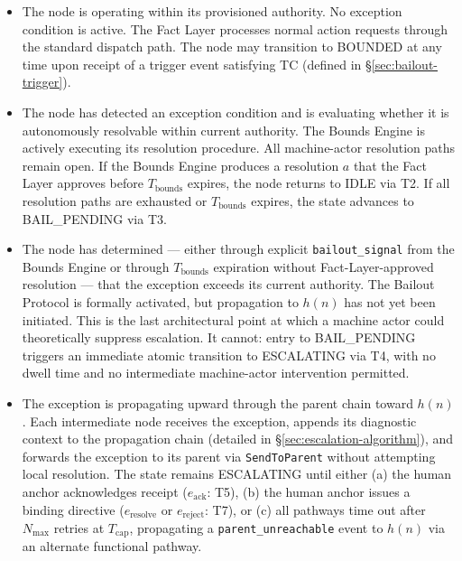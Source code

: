 \begin{itemize}\itemsep0em
\item[\textbf{IDLE.}] The node is operating within its provisioned authority. No exception condition is active. The Fact Layer processes normal action requests through the standard dispatch path. The node may transition to BOUNDED at any time upon receipt of a trigger event satisfying TC (defined in \S\ref{sec:bailout-trigger}).

\item[\textbf{BOUNDED.}] The node has detected an exception condition and is evaluating whether it is autonomously resolvable within current authority. The Bounds Engine is actively executing its resolution procedure. All machine-actor resolution paths remain open. If the Bounds Engine produces a resolution $a$ that the Fact Layer approves before $T_{\text{bounds}}$ expires, the node returns to IDLE via T2. If all resolution paths are exhausted or $T_{\text{bounds}}$ expires, the state advances to BAIL\_PENDING via T3.

\item[\textbf{BAIL\_PENDING.}] The node has determined — either through explicit \texttt{bailout\_signal} from the Bounds Engine or through $T_{\text{bounds}}$ expiration without Fact-Layer-approved resolution — that the exception exceeds its current authority. The Bailout Protocol is formally activated, but propagation to $h(n)$ has not yet been initiated. This is the last architectural point at which a machine actor could theoretically suppress escalation. It cannot: entry to BAIL\_PENDING triggers an immediate atomic transition to ESCALATING via T4, with no dwell time and no intermediate machine-actor intervention permitted.

\item[\textbf{ESCALATING.}] The exception is propagating upward through the parent chain toward $h(n)$. Each intermediate node receives the exception, appends its diagnostic context to the propagation chain (detailed in \S\ref{sec:escalation-algorithm}), and forwards the exception to its parent via \texttt{SendToParent} without attempting local resolution. The state remains ESCALATING until either (a) the human anchor acknowledges receipt ($e_{\text{ack}}$: T5), (b) the human anchor issues a binding directive ($e_{\text{resolve}}$ or $e_{\text{reject}}$: T7), or (c) all pathways time out after $N_{\max}$ retries at $T_{\text{cap}}$, propagating a \texttt{parent\_unreachable} event to $h(n)$ via an alternate functional pathway.


\end{itemize}
